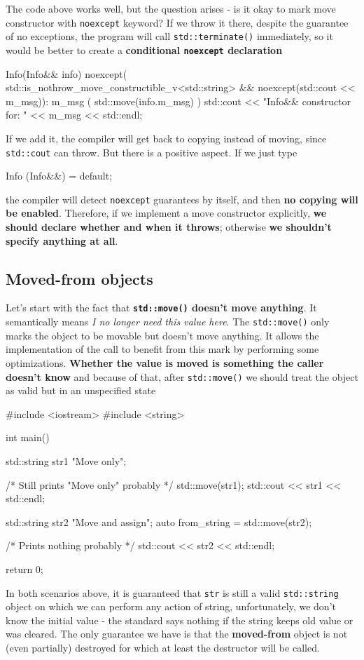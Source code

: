 \documentclass[../main]{subfiles}
\begin{document}
    The code above works well, but the question arises - is it okay to mark move constructor with \texttt{noexcept} keyword?
If we throw it there, despite the guarantee of no exceptions, the program will call \texttt{std::terminate()} immediately,
so it would be better to create a \textbf{conditional \texttt{noexcept} declaration}
\begin{Code}
    Info(Info&& info) noexcept(
        std::is_nothrow_move_constructible_v<std::string>
        && noexcept(std::cout << m_msg)):
        m_msg ( std::move(info.m_msg) )
    {
        std::cout << "Info&& constructor for: "
                  << m_msg << std::endl;
    }
\end{Code}
\noindent
If we add it, the compiler will get back to copying instead of moving, since \texttt{std::cout} can throw. But there is a positive aspect. If we just type
\begin{Code}
    Info (Info&&) = default;
\end{Code}
\noindent
the compiler will detect \texttt{noexcept} guarantees by itself, and then \textbf{no copying will be enabled}. Therefore, if we implement
a move constructor explicitly, \textbf{we should declare whether and when it throws}; otherwise \textbf{we shouldn't specify anything at all}.

\subsection{Moved-from objects}
    Let's start with the fact that \textbf{\texttt{std::move()} doesn't move anything}. It semantically means \textit{I no longer need this value here}.
The \texttt{std::move()} only marks the object to be movable but doesn't move anything. It allows the implementation of the call to benefit from this mark by
performing some optimizations. \textbf{Whether the value is moved is something the caller doesn't know} and because of that, after \texttt{std::move()} we
should treat the object as valid but in an unspecified state
\begin{Code}
    #include <iostream>
    #include <string>
    
    int main()
    {
        std::string str1 {"Move only"};
        
        /* Still prints "Move only" probably */
        std::move(str1);
        std::cout << str1 << std::endl;
        
        
        std::string str2 {"Move and assign"};
        auto from_string = std::move(str2);
        
        /* Prints nothing probably */
        std::cout << str2 << std::endl;
    
        return 0;
    }
\end{Code}
\noindent
In both scenarios above, it is guaranteed that \texttt{str} is still a valid \texttt{std::string} object on which we can perform any action of string,
unfortunately, we don't know the initial value - the standard says nothing if the string keeps old value or was cleared. The only guarantee we have is
that the \textbf{moved-from} object is not (even partially) destroyed for which at least the destructor will be called.\newline
\end{document}
